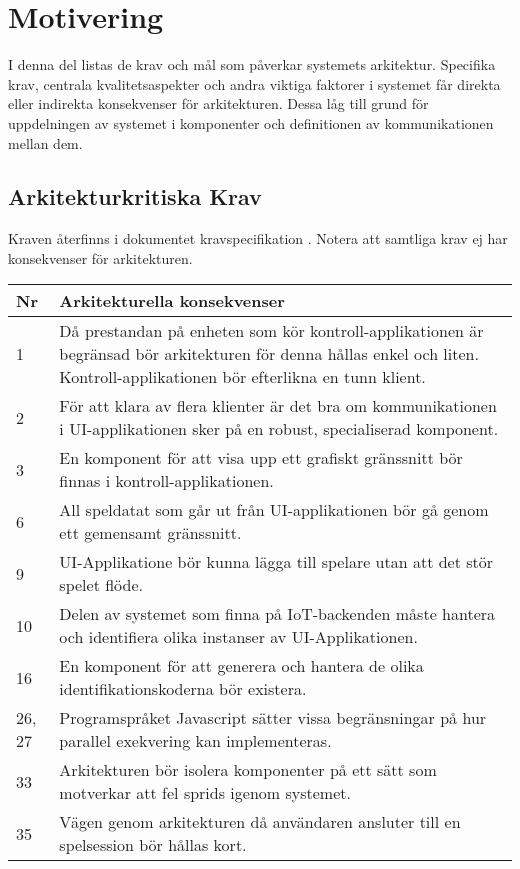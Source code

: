 \section{Motivering}
I denna del listas de krav och mål som påverkar systemets arkitektur. Specifika krav, centrala kvalitetsaspekter och andra viktiga faktorer i systemet får direkta eller indirekta konsekvenser för arkitekturen. Dessa låg till grund för uppdelningen av systemet i komponenter och definitionen av kommunikationen mellan dem.

\subsection{Arkitekturkritiska Krav}
Kraven återfinns i dokumentet kravspecifikation \cite{bib-kravspec}. Notera att samtliga krav ej har konsekvenser för arkitekturen.\\

\begin{center}
    \begin{tabular}{|p{1cm}|p{13cm}|}
        \hline
        \textbf{Nr} & \textbf{Arkitekturella konsekvenser}\\
        \hline
        1 & Då prestandan på enheten som kör kontroll-applikationen är begränsad bör arkitekturen för denna hållas enkel och liten. Kontroll-applikationen bör efterlikna en tunn klient.\\
        \hline
        2 & För att klara av flera klienter är det bra om kommunikationen i UI-applikationen sker på en robust, specialiserad komponent.\\
        \hline
        3 & En komponent för att visa upp ett grafiskt gränssnitt bör finnas i kontroll-applikationen.\\
        \hline
        6 & All speldatat som går ut från UI-applikationen bör gå genom ett gemensamt gränssnitt.\\
        \hline
        9 & UI-Applikatione bör kunna lägga till spelare utan att det stör spelet flöde.\\
        \hline
        10 & Delen av systemet som finna på IoT-backenden måste hantera och identifiera olika instanser av UI-Applikationen.\\
        \hline
        16 & En komponent för att generera och hantera de olika identifikationskoderna bör existera.\\
        \hline
        26, 27 & Programspråket Javascript sätter vissa begränsningar på hur parallel exekvering kan implementeras.\\
        \hline
        33 & Arkitekturen bör isolera komponenter på ett sätt som motverkar att fel sprids igenom systemet.\\
        \hline
        35 & Vägen genom arkitekturen då användaren ansluter till en spelsession bör hållas kort.\\
        \hline
    \end{tabular}
\end{center}

